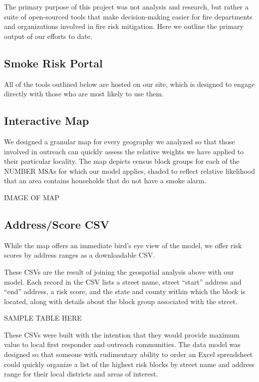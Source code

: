 \documentclass{sig-alternate}
\begin{document}
The primary purpose of this project was not analysis and research, but rather a suite of open-sourced tools that make decision-making easier for fire departments and organizations involved in fire risk mitigation. Here we outline the primary output of our efforts to date.

\subsection{Smoke Risk Portal}

All of the tools outlined below are hosted on our site, which is designed to engage directly with those who are most likely to use them. 

\subsection{Interactive Map}

We designed a granular map for every geography we analyzed so that those involved in outreach can quickly assess the relative weights we have applied to their particular locality. The map depicts census block groups for each of the NUMBER MSAs for which our model applies, shaded to reflect relative likelihood that an area contains households that do not have a smoke alarm.

IMAGE OF MAP

\subsection{Address/Score CSV}

While the map offers an immediate bird's eye view of the model, we offer risk scores by address ranges as a downloadable CSV.

These CSVs are the result of joining the geospatial analysis above with our model. Each record in the CSV lists a street name, street ``start'' address and ``end'' address, a risk score, and the state and county within which the block is located, along with details about the block group associated with the street.

SAMPLE TABLE HERE

These CSVs were built with the intention that they would provide maximum value to local first responder and outreach communities. The data model was designed so that someone with rudimentary ability to order an Excel spreadsheet could quickly organize a list of the highest risk blocks by street name and address range for their local districts and areas of interest.
\end{document}
